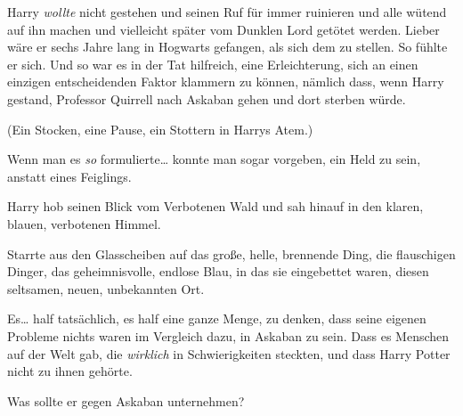 Harry \emph{wollte} nicht gestehen und seinen Ruf für immer ruinieren und alle wütend auf ihn machen und vielleicht später vom Dunklen Lord getötet werden. Lieber wäre er sechs Jahre lang in Hogwarts gefangen, als sich dem zu stellen. So fühlte er sich. Und so war es in der Tat hilfreich, eine Erleichterung, sich an einen einzigen entscheidenden Faktor klammern zu können, nämlich dass, wenn Harry gestand, Professor Quirrell nach Askaban gehen und dort sterben würde.

(Ein Stocken, eine Pause, ein Stottern in Harrys Atem.)

Wenn man es \emph{so} formulierte… konnte man sogar vorgeben, ein Held zu sein, anstatt eines Feiglings.

Harry hob seinen Blick vom Verbotenen Wald und sah hinauf in den klaren, blauen, verbotenen Himmel.

Starrte aus den Glasscheiben auf das große, helle, brennende Ding, die flauschigen Dinger, das geheimnisvolle, endlose Blau, in das sie eingebettet waren, diesen seltsamen, neuen, unbekannten Ort.

Es… half tatsächlich, es half eine ganze Menge, zu denken, dass seine eigenen Probleme nichts waren im Vergleich dazu, in Askaban zu sein. Dass es Menschen auf der Welt gab, die \emph{wirklich} in Schwierigkeiten steckten, und dass Harry Potter nicht zu ihnen gehörte.

Was sollte er gegen Askaban unternehmen?

